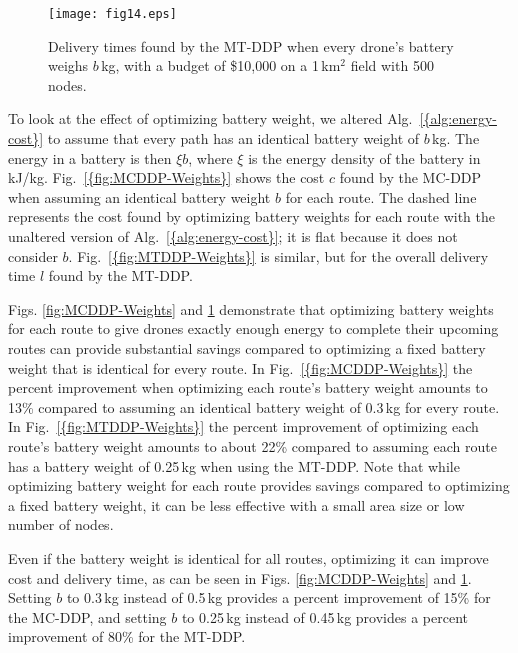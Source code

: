 \documentclass[journal]{IEEEtran}
\begin{document}
\begin{figure}[t]
\centering
\texttt{[image: fig14.eps]}
\caption{Delivery times found by the MT-DDP when every drone's battery weighs ${\ensuremath{b}}$\,kg, with a budget of \$10,000 on a 1\,km$^2$ field with 500 nodes.}
\label{fig:MTDDP-Weights}
\end{figure}

To look at the effect of optimizing battery weight, we altered {Alg.~\ref{{alg:energy-cost}}} to assume that every path has an identical battery weight of ${\ensuremath{b}}$\,kg. The energy in a battery is then ${\ensuremath{\xi}} {\ensuremath{b}}$, where ${\ensuremath{\xi}}$ is the energy density of the battery in kJ/kg. {Fig.~\ref{{fig:MCDDP-Weights}}} shows the cost ${\ensuremath{c}}$ found by the MC-DDP when assuming an identical battery weight ${\ensuremath{b}}$ for each route. The dashed line represents the cost found by optimizing battery weights for each route with the unaltered version of {Alg.~\ref{{alg:energy-cost}}}; it is flat because it does not consider ${\ensuremath{b}}$. {Fig.~\ref{{fig:MTDDP-Weights}}} is similar, but for the overall delivery time ${\ensuremath{l}}$ found by the MT-DDP.

Figs. \ref{fig:MCDDP-Weights} and \ref{fig:MTDDP-Weights} demonstrate that optimizing battery weights for each route to give drones exactly enough energy to complete their upcoming routes can provide substantial savings compared to optimizing a fixed battery weight that is identical for every route. In {Fig.~\ref{{fig:MCDDP-Weights}}} the percent improvement when optimizing each route's battery weight amounts to 13\% compared to assuming an identical battery weight of 0.3\,kg for every route. In {Fig.~\ref{{fig:MTDDP-Weights}}} the percent improvement of optimizing each route's battery weight amounts to about 22\% compared to assuming each route has a battery weight of 0.25\,kg when using the MT-DDP. Note that while optimizing battery weight for each route provides savings compared to optimizing a fixed battery weight, it can be less effective with a small area size or low number of nodes.

Even if the battery weight is identical for all routes, optimizing it can improve cost and delivery time, as can be seen in Figs. \ref{fig:MCDDP-Weights} and \ref{fig:MTDDP-Weights}. Setting ${\ensuremath{b}}$ to 0.3\,kg instead of 0.5\,kg provides a percent improvement of 15\% for the MC-DDP, and setting ${\ensuremath{b}}$ to 0.25\,kg instead of 0.45\,kg provides a percent improvement of 80\% for the MT-DDP.
\end{document}
